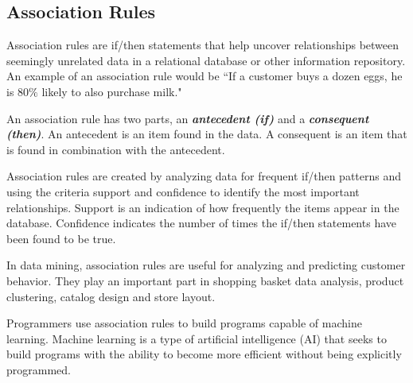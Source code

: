 


\subsection{Association Rules}

Association rules are if/then statements that help uncover relationships between seemingly unrelated data in a relational database or other information repository. An example of an association rule would be ``If a customer buys a dozen eggs, he is $80\%$ likely to also purchase milk."

An association rule has two parts, an \textbf{\emph{antecedent (if)}} and a \textbf{\emph{consequent (then)}}. An antecedent is an item found in the data. A consequent is an item that is found in combination with the antecedent.

Association rules are created by analyzing data for frequent if/then patterns and using the criteria support and confidence to identify the most important relationships. Support is an indication of how frequently the items appear in the database. Confidence indicates the number of times the if/then statements have been found to be true.

In data mining, association rules are useful for analyzing and predicting customer behavior. They play an important part in shopping basket data analysis, product clustering, catalog design and store layout.

Programmers use association rules to build programs capable of machine learning.  Machine learning is a type of artificial intelligence (AI) that seeks to build programs with the ability to become more efficient without being explicitly programmed.
